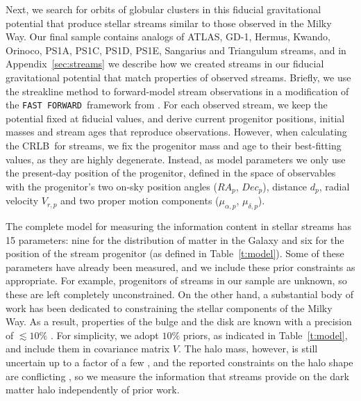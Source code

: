\documentclass[modern]{aastex61}
\newcommand{\acronym}[1]{{\small{#1}}}
\newcommand{\CRLB}{\acronym{CRLB}}
\newcommand{\FF}{\texttt{FAST FORWARD}}
\begin{document}
Next, we search for orbits of globular clusters in this fiducial gravitational potential that produce stellar streams similar to those observed in the Milky Way.
Our final sample contains analogs of ATLAS, GD-1, Hermus, Kwando, Orinoco, PS1A, PS1C, PS1D, PS1E, Sangarius and Triangulum streams, and in Appendix~\ref{sec:streams} we describe how we created streams in our fiducial gravitational potential that match properties of observed streams.
Briefly, we use the streakline method to forward-model stream observations in a modification of the \FF\ framework from \citet{bonaca2014}.
For each observed stream, we keep the potential fixed at fiducial values, and derive current progenitor positions, initial masses and stream ages that reproduce observations.
However, when calculating the \CRLB\ for streams, we fix the progenitor mass and age to their best-fitting values, as they are highly degenerate.
Instead, as model parameters we only use the present-day position of the progenitor, defined in the space of observables with the progenitor's two on-sky position angles ($RA_p$, $Dec_p$), distance $d_p$, radial velocity $V_{r,p}$ and two proper motion components ($\mu_{\alpha,p}$, $\mu_{\delta,p}$). 

The complete model for measuring the information content in stellar streams has 15 parameters: nine for the distribution of matter in the Galaxy and six for the position of the stream progenitor (as defined in Table~\ref{t:model}).
Some of these parameters have already been measured, and we include these prior constraints as appropriate. 
For example, progenitors of streams in our sample are unknown, so these are left completely unconstrained.
On the other hand, a substantial body of work has been dedicated to constraining the stellar components of the Milky Way.
As a result, properties of the bulge and the disk are known with a precision of $\lesssim10\%$ \citep{bobylev2017}.
For simplicity, we adopt $10\%$ priors, as indicated in Table~\ref{t:model}, and include them in covariance matrix $V$.
The halo mass, however, is still uncertain up to a factor of a few \citep[e.g.,][]{eadie2016, zaritsky2017}, and the reported constraints on the halo shape are conflicting \citep[e.g.,][]{loebman2014, bowden2016}, so we measure the information that streams provide on the dark matter halo independently of prior work.
\end{document}
